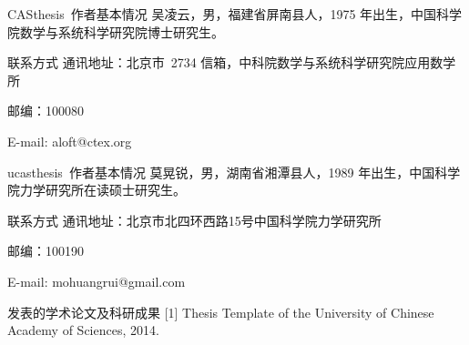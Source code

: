 \begin{resumepub}

\begin{resume}

\begin{resumesection}{CASthesis~作者基本情况}
吴凌云，男，福建省屏南县人，1975 年出生，中国科学院数学与系统科学研究院博士研究生。
\end{resumesection}

\begin{resumelist}{联系方式}
通讯地址：北京市~2734 信箱，中科院数学与系统科学研究院应用数学所

邮编：100080

E-mail: aloft@ctex.org
\end{resumelist}

\begin{resumesection}{ucasthesis~作者基本情况}
莫晃锐，男，湖南省湘潭县人，1989 年出生，中国科学院力学研究所在读硕士研究生。
\end{resumesection}

\begin{resumelist}{联系方式}
通讯地址：北京市北四环西路15号中国科学院力学研究所

邮编：100190

E-mail: mohuangrui@gmail.com
\end{resumelist}

\begin{resumelist}{发表的学术论文及科研成果}
[1] Thesis Template of the University of Chinese Academy of Sciences, 2014.
\end{resumelist}

\end{resume}

\end{resumepub}
